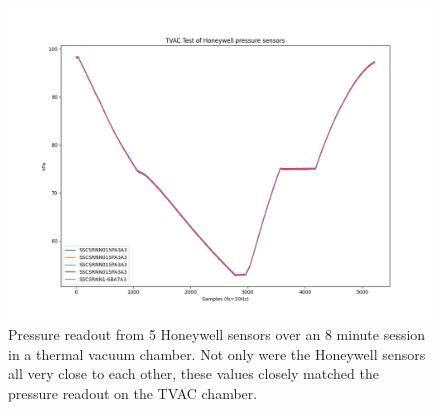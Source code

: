 \documentclass{article}
\begin{document}
\begin{figure}
	\centering
	\includegraphics[width=\textwidth]{images/tvac-20210602-large.png}
	\caption{Pressure readout from 5 Honeywell sensors over an 8 minute session in a thermal vacuum chamber. Not only were the Honeywell sensors all very close to each other, these values closely matched the pressure readout on the TVAC chamber.}
	\label{fig:pressure-tvac}
\end{figure}


%
%
\end{document}
